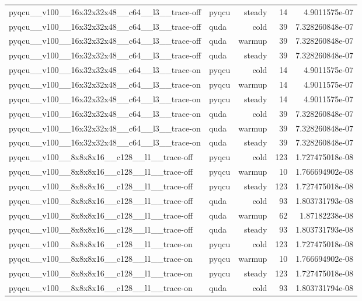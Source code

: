 \begin{table}[htbp]
\begin{tabular}{@{}llrrr@{}}
pyqcu\_\_v100\_\_16x32x32x48\_\_c64\_\_l3\_\_trace-off & pyqcu & steady & 14 & 4.9011575e-07 \\
pyqcu\_\_v100\_\_16x32x32x48\_\_c64\_\_l3\_\_trace-off & quda & cold & 39 & 7.328260848e-07 \\
pyqcu\_\_v100\_\_16x32x32x48\_\_c64\_\_l3\_\_trace-off & quda & warmup & 39 & 7.328260848e-07 \\
pyqcu\_\_v100\_\_16x32x32x48\_\_c64\_\_l3\_\_trace-off & quda & steady & 39 & 7.328260848e-07 \\
pyqcu\_\_v100\_\_16x32x32x48\_\_c64\_\_l3\_\_trace-on & pyqcu & cold & 14 & 4.9011575e-07 \\
pyqcu\_\_v100\_\_16x32x32x48\_\_c64\_\_l3\_\_trace-on & pyqcu & warmup & 14 & 4.9011575e-07 \\
pyqcu\_\_v100\_\_16x32x32x48\_\_c64\_\_l3\_\_trace-on & pyqcu & steady & 14 & 4.9011575e-07 \\
pyqcu\_\_v100\_\_16x32x32x48\_\_c64\_\_l3\_\_trace-on & quda & cold & 39 & 7.328260848e-07 \\
pyqcu\_\_v100\_\_16x32x32x48\_\_c64\_\_l3\_\_trace-on & quda & warmup & 39 & 7.328260848e-07 \\
pyqcu\_\_v100\_\_16x32x32x48\_\_c64\_\_l3\_\_trace-on & quda & steady & 39 & 7.328260848e-07 \\
pyqcu\_\_v100\_\_8x8x8x16\_\_c128\_\_l1\_\_trace-off & pyqcu & cold & 123 & 1.727475018e-08 \\
pyqcu\_\_v100\_\_8x8x8x16\_\_c128\_\_l1\_\_trace-off & pyqcu & warmup & 10 & 1.766694902e-08 \\
pyqcu\_\_v100\_\_8x8x8x16\_\_c128\_\_l1\_\_trace-off & pyqcu & steady & 123 & 1.727475018e-08 \\
pyqcu\_\_v100\_\_8x8x8x16\_\_c128\_\_l1\_\_trace-off & quda & cold & 93 & 1.803731793e-08 \\
pyqcu\_\_v100\_\_8x8x8x16\_\_c128\_\_l1\_\_trace-off & quda & warmup & 62 & 1.87182238e-08 \\
pyqcu\_\_v100\_\_8x8x8x16\_\_c128\_\_l1\_\_trace-off & quda & steady & 93 & 1.803731793e-08 \\
pyqcu\_\_v100\_\_8x8x8x16\_\_c128\_\_l1\_\_trace-on & pyqcu & cold & 123 & 1.727475018e-08 \\
pyqcu\_\_v100\_\_8x8x8x16\_\_c128\_\_l1\_\_trace-on & pyqcu & warmup & 10 & 1.766694902e-08 \\
pyqcu\_\_v100\_\_8x8x8x16\_\_c128\_\_l1\_\_trace-on & pyqcu & steady & 123 & 1.727475018e-08 \\
pyqcu\_\_v100\_\_8x8x8x16\_\_c128\_\_l1\_\_trace-on & quda & cold & 93 & 1.803731794e-08 \\

\end{tabular}
\end{table}
